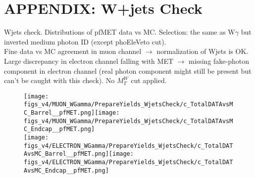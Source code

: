 \section{APPENDIX: W+jets Check}
\label{sec:WjetsCheck}

Wjets check. Distributions of pfMET data vs MC. Selection: the same as W$\gamma$ but inverted medium photon ID (except phoEleVeto cut).\\
Fine data vs MC agreement in muon channel $\rightarrow$ normalization of Wjets is OK. Large discrepancy in electron channel falling with MET $\rightarrow$ missing fake-photon component in electron channel (real photon component might still be present but can't be caught with this check). No $M^W_T$ cut applied. \\

\begin{figure}[htb]
  \begin{center}
   \texttt{[image: figs\_v4/MUON\_WGamma/PrepareYields\_WjetsCheck/c\_TotalDATAvsMC\_Barrel\_\_pfMET.png]}\texttt{[image: figs\_v4/MUON\_WGamma/PrepareYields\_WjetsCheck/c\_TotalDATAvsMC\_Endcap\_\_pfMET.png]}\\
\texttt{[image: figs\_v4/ELECTRON\_WGamma/PrepareYields\_WjetsCheck/c\_TotalDATAvsMC\_Barrel\_\_pfMET.png]}\texttt{[image: figs\_v4/ELECTRON\_WGamma/PrepareYields\_WjetsCheck/c\_TotalDATAvsMC\_Endcap\_\_pfMET.png]}\\
  \label{fig:DATAvsMC_Wjets_pfMET}
  \end{center}
\end{figure}

